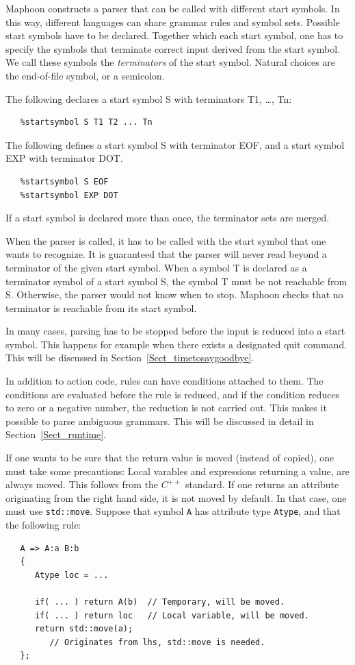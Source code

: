 \documentclass{article}
\begin{document}
Maphoon constructs a parser that can be called with different
start symbols. In this way, different languages
can share grammar rules and symbol sets.
Possible start symbols have to be declared. 
Together which each start symbol, one has to specify the 
symbols that terminate correct input derived from the
start symbol. We call these symbols
the \emph{terminators} of the start symbol.
Natural choices are the end-of-file symbol, or a semicolon.

\noindent
The following declares a start symbol S with terminators
T1, \ldots, Tn:
\begin{verbatim}
   %startsymbol S T1 T2 ... Tn  
\end{verbatim}
The following defines a start symbol S with terminator
EOF, and a start symbol EXP with terminator DOT.
\begin{verbatim}
   %startsymbol S EOF
   %startsymbol EXP DOT
\end{verbatim}
If a start symbol is declared more than once, the terminator
sets are merged. 

When the parser is called, it has to be called with
the start symbol that one wants to recognize. 
It is guaranteed that the parser will never read beyond
a terminator of the given start symbol. 
When a symbol T is declared as a terminator symbol of a start
symbol S, the symbol T must be not reachable from S. 
Otherwise, the parser would not know when to stop.
Maphoon checks that no terminator is reachable from its
start symbol. 

In many cases, parsing has to be stopped before the input is reduced 
into a start symbol. This happens for example when there
exists a designated quit command. This will be discussed
in Section~\ref{Sect_timetosaygoodbye}.

In addition to action code, rules can have conditions attached to them.
The conditions are evaluated before the rule is reduced, and 
if the condition reduces to zero or a negative number, the reduction is
not carried out. This makes it possible to parse ambiguous grammars. 
This will be discussed in detail in Section~\ref{Sect_runtime}.

If one wants to be sure that the return value is moved 
(instead of copied), one must take some precautions:
Local varables and expressions returning a value, are always moved.
This follows from the $ C^{++} $ standard. If one returns an
attribute originating from the right hand side, it is not moved by default.
In that case, one must use \verb|std::move|.
Suppose that symbol \verb|A| has attribute type \verb|Atype|,
and that the following rule: 
\begin{verbatim}
   A => A:a B:b  
   {
      Atype loc = ...
 
      if( ... ) return A(b)  // Temporary, will be moved.
      if( ... ) return loc   // Local variable, will be moved.
      return std::move(a);   
         // Originates from lhs, std::move is needed.
   }; \end{verbatim} 
\end{document}
